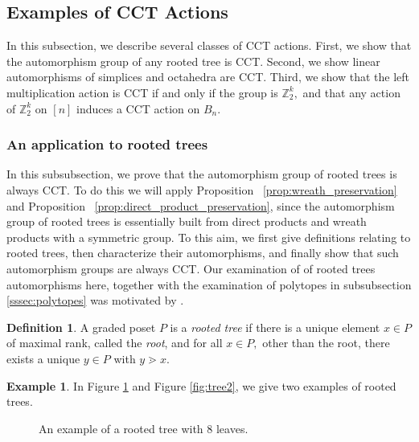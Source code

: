 \documentclass[10 pt]{amsart}
\theoremstyle{plain}
\theoremstyle{definition}
\newtheorem{defn}[thm]{Definition}
\newtheorem{eg}[thm]{Example}
\theoremstyle{remark}
\numberwithin{equation}{section}
\newcommand\ssec{\subsection}
\newcommand\sssec{\subsubsection}
\newcommand\BZ{{\mathbb Z}}
\begin{document}
\ssec{Examples of CCT Actions}\label{ssec:CCT_examples}

In this subsection, we describe several classes of CCT actions. First, we show that the automorphism group of any rooted tree is CCT. Second, we show linear automorphisms of simplices and octahedra are CCT. Third, we show that the left multiplication action is CCT if and only if the group is $\BZ_2^k,$ and that any action of $\BZ_2^k$ on $[n]$ induces a CCT action on $B_n.$

\sssec{An application to rooted trees}
\label{ssec:rooted_trees}
In this subsubsection, we prove that the automorphism group of rooted trees is always CCT. To do this we will apply Proposition ~\ref{prop:wreath_preservation} and Proposition ~\ref{prop:direct_product_preservation}, since the automorphism group of rooted trees is essentially built from direct products and wreath products with a symmetric group. To this aim, we first give definitions relating to rooted trees, then characterize their automorphisms, and finally show that such automorphism groups are always CCT. Our examination of of rooted trees automorphisms here, together with the examination of polytopes in subsubsection \ref{sssec:polytopes} was motivated by \cite[Section 5]{permutation_polytopes}.

\begin{defn}
A graded poset $P$ is a {\it rooted tree} if there is a unique element $x \in P$ of maximal rank, called the {\it root}, and for all $x \in P,$ other than the root, there exists a unique $y \in P$ with $y \gtrdot x.$
\end{defn}

\begin{eg}
In Figure \ref{fig:tree1} and Figure \ref{fig:tree2}, we give two examples of rooted trees.
\end{eg}
\begin{figure}[h!]
\caption{\label{fig:tree1} An example of a rooted tree with $8$ leaves.}
\end{figure}
\end{document}
